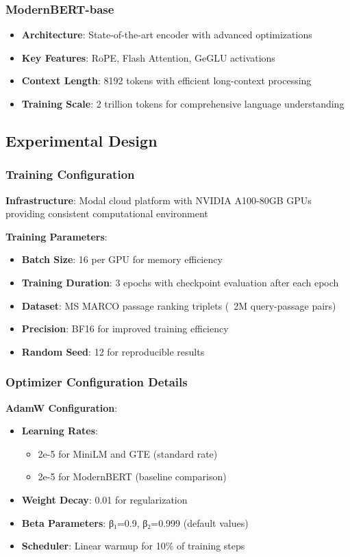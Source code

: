 \subsubsection{ModernBERT-base}
\begin{itemize}
    \item \textbf{Architecture}: State-of-the-art encoder with advanced optimizations
    \item \textbf{Key Features}: RoPE, Flash Attention, GeGLU activations
    \item \textbf{Context Length}: 8192 tokens with efficient long-context processing
    \item \textbf{Training Scale}: 2 trillion tokens for comprehensive language understanding
\end{itemize}

\subsection{Experimental Design}

\subsubsection{Training Configuration}

\textbf{Infrastructure}: Modal cloud platform with NVIDIA A100-80GB GPUs providing consistent computational environment

\textbf{Training Parameters}:
\begin{itemize}
    \item \textbf{Batch Size}: 16 per GPU for memory efficiency
    \item \textbf{Training Duration}: 3 epochs with checkpoint evaluation after each epoch
    \item \textbf{Dataset}: MS MARCO passage ranking triplets (~2M query-passage pairs)
    \item \textbf{Precision}: BF16 for improved training efficiency
    \item \textbf{Random Seed}: 12 for reproducible results
\end{itemize}

\subsubsection{Optimizer Configuration Details}

\textbf{AdamW Configuration}:
\begin{itemize}
    \item \textbf{Learning Rates}: 
    \begin{itemize}
        \item 2e-5 for MiniLM and GTE (standard rate)
        \item 2e-5 for ModernBERT (baseline comparison)
    \end{itemize}
    \item \textbf{Weight Decay}: 0.01 for regularization
    \item \textbf{Beta Parameters}: β₁=0.9, β₂=0.999 (default values)
    \item \textbf{Scheduler}: Linear warmup for 10\% of training steps
\end{itemize}

